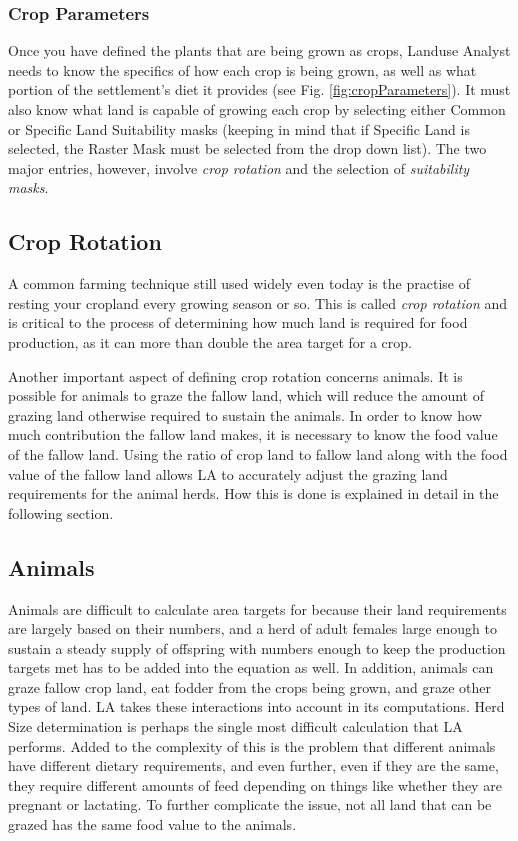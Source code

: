   \subsubsection{Crop Parameters}
  \label{cropParameters}
  Once you have defined the plants that are being grown as crops, Landuse
  Analyst needs to know the specifics of how each crop is being grown, as well
  as what portion of the settlement's diet it provides (see Fig.
  \ref{fig:cropParameters}).  It must also know what land is capable of growing
  each crop by selecting either Common or Specific Land Suitability masks
  (keeping in mind that if Specific Land is selected, the Raster Mask must be
  selected from the drop down list).  The two major entries, however, involve
  \textit{crop rotation} and the selection of \textit{suitability masks}.

    \subsection{Crop Rotation}
    \label{cropRotation}
    A common farming technique still used widely even today is the practise of
    resting your cropland every growing season or so.  This is called
    \textit{crop rotation} and is critical to the process of determining how
    much land is required for food production, as it can more than double the
    area target for a crop. 

    Another important aspect of defining crop rotation concerns animals.  It is
    possible for animals to graze the fallow land, which will reduce the amount
    of grazing land otherwise required to sustain the animals.  In order to
    know how much contribution the fallow land makes, it is necessary to know
    the food value of the fallow land.  Using the ratio of crop land to fallow
    land along with the food value of the fallow land allows LA to
    accurately adjust the grazing land requirements for the animal herds.  How
    this is done is explained in detail in the following section.

\subsection{Animals}
Animals are difficult to calculate area targets for because their land
requirements are largely based on their numbers, and a herd of adult
females large enough to sustain a steady supply of offspring with numbers
enough to keep the production targets met has to be added into the equation as
well.  In addition, animals can graze fallow crop land, eat fodder from
the crops being grown, and graze other types of land.  LA takes these
interactions into account in its computations.
Herd Size determination is perhaps the single most difficult calculation that
LA performs.  Added to the complexity of this is the problem that different
animals have different dietary requirements, and even further, even if they
are the same, they require different amounts of feed depending on things like
whether they are pregnant or lactating.  To further complicate the issue, not all land that can be grazed has the same food value to the animals.

